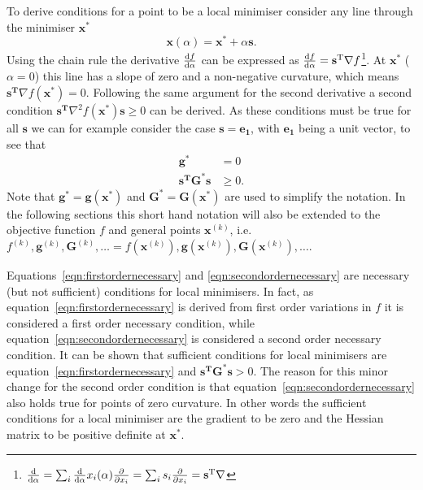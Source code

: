 To derive conditions for a point to be a local minimiser consider any line
through the minimiser $\mathbf{x^*}$
%
\begin{equation}
    \mathbf{x}(\alpha)=\mathbf{x^*}+\alpha\mathbf{s}.
\end{equation}
%
Using the chain rule the derivative $\dv{f}{\alpha}$ can be expressed as
$\dv{f}{\alpha}=\mathbf{s^\text{T}}\nabla
f$\footnote{$\dv{\alpha}=\sum_i\dv{\alpha}x_i(\alpha)\pdv{x_i}=\sum_i
s_i\pdv{x_i}=\mathbf{s^\text{T}}\nabla$}. At $\mathbf{x^*}$ ($\alpha=0$) this
line has a slope of zero and a non-negative curvature, which means
$\mathbf{s^\text{T}}\nabla f(\mathbf{x^*})=0$. Following the same argument for
the second derivative a second condition $\mathbf{s^\text{T}}\nabla^2
f(\mathbf{x^*})\mathbf{s}\geq 0$ can be derived. As these conditions must be
true for all $\mathbf{s}$ we can for example consider the case
$\mathbf{s}=\mathbf{e_1}$, with $\mathbf{e_1}$ being a unit vector, to see that
%
\begin{align}
    \mathbf{g^*}&=0\label{eqn:firstordernecessary}\\
    \mathbf{s^\text{T}}\mathbf{G^*}\mathbf{s}&\geq 0.\label{eqn:secondordernecessary}
\end{align}
%
Note that $\mathbf{g^*}=\mathbf{g}(\mathbf{x^*})$ and
$\mathbf{G^*}=\mathbf{G}(\mathbf{x^*})$ are used to simplify the notation. In
the following sections this short hand notation will also be extended to the
objective function $f$ and general points $\mathbf{x}^{(k)}$, i.e.
$f^{(k)},\mathbf{g}^{(k)},\mathbf{G}^{(k)},\dots=f\left(\mathbf{x}^{(k)}\right),\mathbf{g}\left(\mathbf{x}^{(k)}\right),\mathbf{G}\left(\mathbf{x}^{(k)}\right),\dots$.

Equations~\eqref{eqn:firstordernecessary} and \eqref{eqn:secondordernecessary}
are necessary (but not sufficient) conditions for local minimisers. In fact, as
equation~\eqref{eqn:firstordernecessary} is derived from first order variations
in $f$ it is considered a first order necessary condition, while
equation~\eqref{eqn:secondordernecessary} is considered a second order
necessary condition. It can be shown that sufficient conditions for local
minimisers are equation~\eqref{eqn:firstordernecessary} and
$\mathbf{s^\text{T}}\mathbf{G^*}\mathbf{s}>
0$.\autocite{Fletcher_Practicalmethodsoptimization_1987} The reason for this
minor change for the second order condition is that
equation~\eqref{eqn:secondordernecessary} also holds true for points of zero
curvature. In other words the sufficient conditions for a local minimiser are
the gradient to be zero and the Hessian matrix to be positive definite at
$\mathbf{x^*}$.


